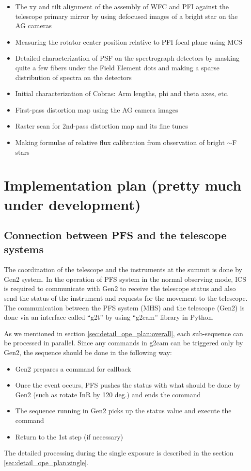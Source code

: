 \documentclass[a4paper]{article}
\begin{document}
\begin{itemize}
\item The xy and tilt alignment of the assembly of WFC and PFI against
  the telescope primary mirror by using defocused images of a bright
  star on the AG cameras
\item Measuring the rotator center position relative to PFI focal plane using MCS
\item Detailed characterization of PSF on the spectrograph detectors
  by masking quite a few fibers under the Field Element dots and making a sparse distribution of spectra on the detectors
\item Initial characterization of Cobras: Arm lengths, phi and theta axes, etc.
\item First-pass distortion map using the AG camera images
\item Raster scan for 2nd-pass distortion map and its fine tunes
\item Making formulae of relative flux calibration from observation of bright $\sim$F stars

\end{itemize}

\section{Implementation plan (pretty much under development)}
\subsection{Connection between PFS and the telescope systems}
The coordination of the telescope and the instruments at the summit is
done by Gen2 system. In the operation of PFS system in the normal
observing mode, ICS is required to communicate with Gen2 to receive
the telescope status and also send the status of the instrument and
requests for the movement to the telescope. The communication between
the PFS system (MHS) and the telescope (Gen2) is done via an interface
called ``g2t'' by using ``g2cam'' library in Python.

As we mentioned in section \ref{sec:detail_ope_plan:overall}, each
sub-sequence can be processed in parallel. Since any commands in g2cam
can be triggered only by Gen2, the sequence should be done in the
following way:
\begin{itemize}
\item Gen2 prepares a command for callback
\item Once the event occurs, PFS pushes the status with what should be done by Gen2 (such as rotate InR by 120 deg.) and ends the command
\item The sequence running in Gen2 picks up the status value and execute the command
\item Return to the 1st step (if necessary)
\end{itemize}
The detailed processing during the single exposure is described in the section \ref{sec:detail_ope_plan:single}.
\end{document}
